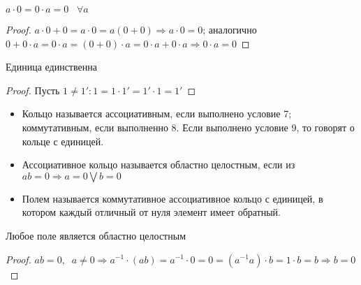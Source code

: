 \begin{proposition}
$a\cdot 0=0\cdot a=0 \;\;\;\forall a$
\end{proposition}
\begin{proof}
$a \cdot 0+0=a \cdot 0 = a(0+0) \Rightarrow a \cdot 0 =0$; аналогично $0+0 \cdot a=0 \cdot a=(0 + 0) \cdot a =0 \cdot a + 0 \cdot a \Rightarrow 0 \cdot a =0$
\end{proof}
\begin{proposition}
Единица единственна
\end{proposition}
\begin{proof}
Пусть $1\neq1': 1=1\cdot 1'=1'\cdot 1=1'$
\end{proof}
\begin{itemize}
    \item Кольцо называется ассоциативным, если выполнено условие 7; коммутативным, если выполненно 8. Если выполнено условие 9, то говорят о кольце с единицей.
    \item Ассоциативное кольцо называется областно целостным, если из $ab=0\Rightarrow a=0\bigvee b=0$
    \item Полем называется коммутативное ассоциативное кольцо с единицей, в котором каждый отличный от нуля элемент имеет обратный. 
    
\end{itemize}
\begin{proposition}
Любое поле является областно целостным
\end{proposition}
\begin{proof}
$ab=0, \;\;a \neq 0 \Rightarrow a^{-1} \cdot (ab)=a^{-1} \cdot 0=0=(a^{-1}a) \cdot b=1 \cdot b =b \Rightarrow b=0$
\end{proof}
